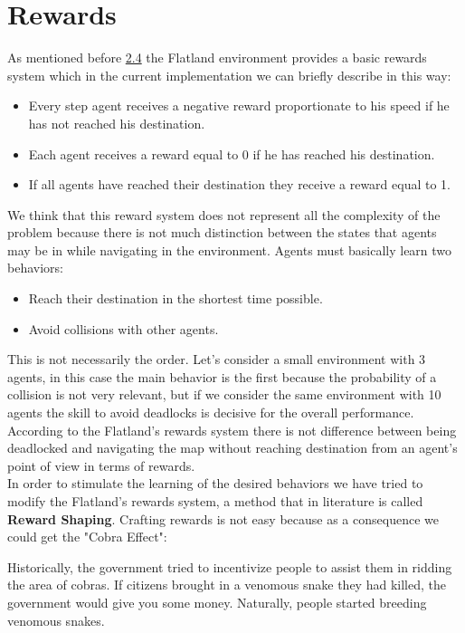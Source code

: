 \section{Rewards}
As mentioned before \hyperref[sec:envRewards]{2.4} the Flatland environment provides a basic rewards system which in the current implementation we can briefly describe in this way:
\begin{itemize}
	\item Every step agent receives a negative reward proportionate to his speed if he has not reached his destination.
	\item Each agent receives a reward equal to 0 if he has reached his destination.
	\item If all agents have reached their destination they receive a reward equal to 1.
\end{itemize}
We think that this reward system does not represent all the complexity of the problem because there is not much distinction between the states that agents may be in while navigating in the environment.
Agents must basically learn two behaviors:
\begin{itemize}
	\item Reach their destination in the shortest time possible.
	\item Avoid collisions with other agents.
\end{itemize}
This is not necessarily the order.
Let's consider a small environment with 3 agents, in this case the main behavior is the first because the probability of a collision is not very relevant, but if we consider the same environment with 10 agents the skill to avoid deadlocks is decisive for the overall performance. \\
According to the Flatland's rewards system there is not difference between being deadlocked and navigating the map without reaching destination from an agent's point of view in terms of rewards. \\
In order to stimulate the learning of the desired behaviors we have tried to modify the Flatland's rewards system, a method that in literature is called \textbf{Reward Shaping}.
Crafting rewards is not easy because as a consequence we could get the "Cobra Effect":

\begin{quoting}[font=itshape, begintext={"}, endtext={ \footnote{https://medium.com/@BonsaiAI/deep-reinforcement-learning-models-tips-tricks-for-writing-reward-functions-a84fe525e8e0}}]
	Historically, the government tried to incentivize people to assist them in ridding the area of cobras.
	If citizens brought in a venomous snake they had killed, the government would give you some money.
	Naturally, people started breeding venomous snakes.
\end{quoting}

